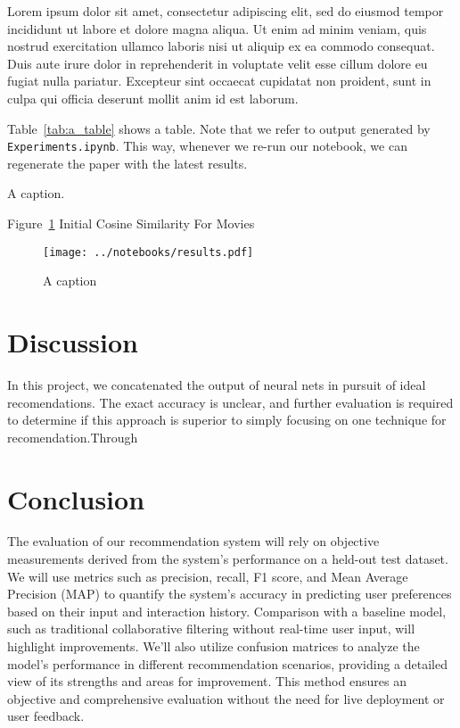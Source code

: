 \documentclass[11pt,a4paper]{article}
\begin{document}
Lorem ipsum dolor sit amet, consectetur adipiscing elit, sed do eiusmod tempor incididunt ut labore et dolore magna aliqua. Ut enim ad minim veniam, quis nostrud exercitation ullamco laboris nisi ut aliquip ex ea commodo consequat. Duis aute irure dolor in reprehenderit in voluptate velit esse cillum dolore eu fugiat nulla pariatur. Excepteur sint occaecat cupidatat non proident, sunt in culpa qui officia deserunt mollit anim id est laborum.


Table~\ref{tab:a_table} shows a table. Note that we refer to output generated by \texttt{Experiments.ipynb}. This way, whenever we re-run our notebook, we can regenerate the paper with the latest results.

\begin{table}[ht]
\centering

\caption{\label{tab:a_table} A caption. }
\end{table}

Figure~\ref{fig:a_label} Initial Cosine Similarity For Movies

\begin{figure}[ht]
	\centering
	\texttt{[image: ../notebooks/results.pdf]}
	\caption{A caption}
	\label{fig:a_label}
\end{figure}

\section{Discussion}

In this project, we concatenated the output of neural nets in pursuit of ideal recomendations. The exact accuracy is unclear, and further evaluation is required to determine if this approach is superior to simply focusing on one technique for recomendation.Through 

\section{Conclusion}
The evaluation of our recommendation system will rely on objective measurements derived from the system's performance on a held-out test dataset. We will use metrics such as precision, recall, F1 score, and Mean Average Precision (MAP) to quantify the system's accuracy in predicting user preferences based on their input and interaction history. Comparison with a baseline model, such as traditional collaborative filtering without real-time user input, will highlight improvements. We'll also utilize confusion matrices to analyze the model's performance in different recommendation scenarios, providing a detailed view of its strengths and areas for improvement. This method ensures an objective and comprehensive evaluation without the need for live deployment or user feedback.
\end{document}
